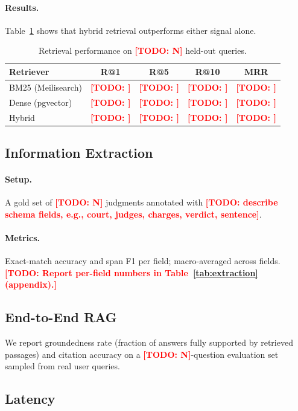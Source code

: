 \documentclass[11pt]{article}
\newcommand{\todo}[1]{\textcolor{red}{\textbf{[TODO: #1]}}}
\begin{document}
\paragraph{Results.}
Table~\ref{tab:retrieval} shows that hybrid retrieval outperforms
either signal alone.

\begin{table}[t]
  \centering
  \small
  \begin{tabular}{lcccc}
    \toprule
    Retriever & R@1 & R@5 & R@10 & MRR \\
    \midrule
    BM25 (Meilisearch) & \todo{} & \todo{} & \todo{} & \todo{} \\
    Dense (pgvector)   & \todo{} & \todo{} & \todo{} & \todo{} \\
    Hybrid             & \todo{} & \todo{} & \todo{} & \todo{} \\
    \bottomrule
  \end{tabular}
  \caption{Retrieval performance on \todo{N} held-out queries.}
  \label{tab:retrieval}
\end{table}

\subsection{Information Extraction}
\label{sec:eval-extraction}

\paragraph{Setup.} A gold set of \todo{N} judgments annotated with
\todo{describe schema fields, e.g., court, judges, charges, verdict,
sentence}.

\paragraph{Metrics.} Exact-match accuracy and span F1 per field;
macro-averaged across fields. \todo{Report per-field numbers in
Table~\ref{tab:extraction} (appendix).}

\subsection{End-to-End RAG}
\label{sec:eval-rag}

We report groundedness rate (fraction of answers fully supported by
retrieved passages) and citation accuracy on a \todo{N}-question
evaluation set sampled from real user queries.

\subsection{Latency}
\label{sec:eval-latency}
\end{document}
